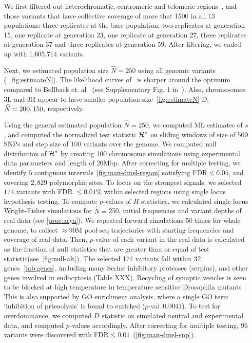 We first filtered out heterochromatic, centromeric and telomeric
regions~\cite{fiston2010drosophila}, and those variants that have
collective coverage of more that 1500 in all 13 populations: three
replicates at the base population, two replicates at generation 15,
one replicate at generation 23, one replicate at generation 27, three
replicates at generation 37 and three replicates at generation
59. After filtering, we ended up with 1,605,714 variants.

Next, we estimated population size $\hat{N}=250$ using all genomic
variants (~\ref{fig:estimateN}). The likelihood curves of \comale\ is
sharper around the optimum compared to Bollback
et. al~\cite{bollback2008estimation} (see Supplementary Fig. 1
in~\cite{orozco2012adaptation}).  Also, chromosomes 3L and 3R appear
to have smaller population size~\ref{fig:estimateN}-D, $\widehat{N}=200,150$,
respectively. 

Using the general estimated population $\hat{N}=250$, we computed ML
estimates of $s$, and computed the normalized test statistic ${\cal H}^*$
on sliding windows of size of 500 SNPs and step size of 100 variants
over the genome.  We computed null distribution of ${\cal H}^*$ by creating
100 chromosome simulations using experimental data parameters and
length of 20Mbp. After correcting for multiple testing, we identify
$5$ contiguous intervals~\ref{fig:man-dmel-region} satisfying
FDR$\le0.05$, and covering $2,829$ polymorphic sites. To focus on the
strongest signals, we selected $174$ variants with FDR $\le0.01$\%
within selected regions using single locus hypothesis testing.  To
compute $p$-values of $H$ statistics, we calculated single locus
Wright-Fisher simulations for $\widehat{N}=$250, initial frequencies
and variant depths of real data (see \ref{proc:arya}). We repeated
forward simulations 50 times for whole genome, to collect $\approx$90M
pool-seq trajectories with starting frequencies and coverage of real
data. Then, $p$-value of each variant in the real data is calculated
as the fraction of null statistics that are greater than or equal of
test statistic(see~\ref{fig:null-alt}).  The selected 174 variants fall within 32
genes~\ref{tab:genes}, including many Serine inhibitory proteases
(serpins), and other genes involved in endocytosis (Table
XXX). Recycling of synaptic vesicles is seen to be blocked at high
temperature in temperature sensitive Drosophila
mutants~\cite{10.1083/jcb.97.2.499KosakaJnlCellBiol1983}. This is also
supported by GO enrichment analysis, where a single GO term
`inhibition of prteoolysis' is found to enriched ($p$-val.:0.0041).
To test for overdominance, we computed $D$ statistic on simulated
neutral and experimental data, and computed $p$-values accordingly.
After correcting for multiple testing, 96 variants were discovered
with FDR$\le 0.01$~(\ref{fig:man-dmel-snp}).

